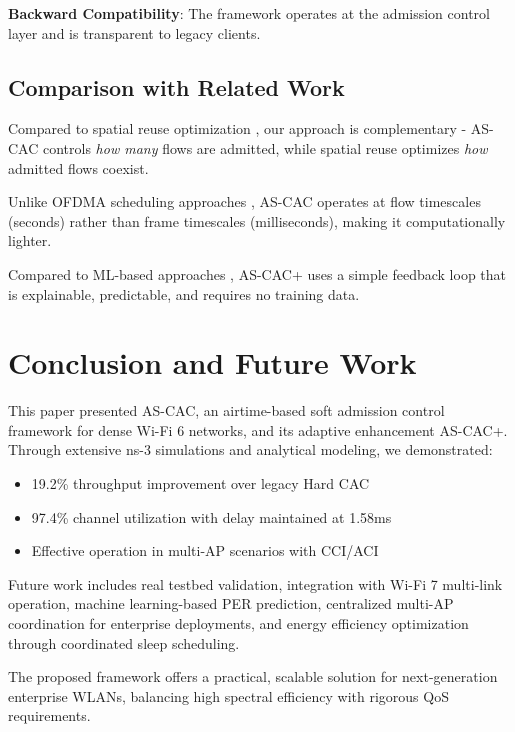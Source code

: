 \documentclass[conference]{IEEEtran}
\begin{document}
\textbf{Backward Compatibility}: The framework operates at the admission control layer and is transparent to legacy clients.

\subsection{Comparison with Related Work}

Compared to spatial reuse optimization \cite{1, 17}, our approach is complementary - AS-CAC controls \textit{how many} flows are admitted, while spatial reuse optimizes \textit{how} admitted flows coexist.

Unlike OFDMA scheduling approaches \cite{11, 15}, AS-CAC operates at flow timescales (seconds) rather than frame timescales (milliseconds), making it computationally lighter.

Compared to ML-based approaches \cite{18}, AS-CAC+ uses a simple feedback loop that is explainable, predictable, and requires no training data.

\section{Conclusion and Future Work}

This paper presented AS-CAC, an airtime-based soft admission control framework for dense Wi-Fi 6 networks, and its adaptive enhancement AS-CAC+. Through extensive ns-3 simulations and analytical modeling, we demonstrated:

\begin{itemize}
    \item 19.2\% throughput improvement over legacy Hard CAC
    \item 97.4\% channel utilization with delay maintained at 1.58ms
    \item Effective operation in multi-AP scenarios with CCI/ACI

\end{itemize}

Future work includes real testbed validation, integration with Wi-Fi 7 multi-link operation, machine learning-based PER prediction, centralized multi-AP coordination for enterprise deployments, and energy efficiency optimization through coordinated sleep scheduling.

The proposed framework offers a practical, scalable solution for next-generation enterprise WLANs, balancing high spectral efficiency with rigorous QoS requirements.
\end{document}

